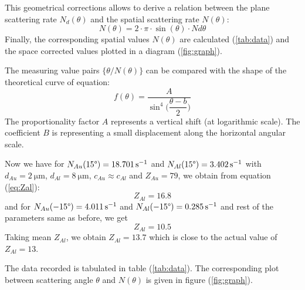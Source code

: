 \documentclass[%
 reprint,
nofootinbib,
 amsmath,amssymb,
 aps,
floatfix,
]{revtex4-2}
\begin{document}
    This geometrical corrections allows to derive a relation between the plane scattering rate $N_d(\theta)$ and the spatial scattering rate $N(\theta)$:
    \begin{equation}
        N (\theta) = 2 \cdot \pi \cdot \sin (\theta) \cdot N d\theta 
    \end{equation}
    Finally, the corresponding spatial values $N(\theta)$ are calculated (\ref{tab:data}) and the space corrected values plotted in a diagram (\ref{fig:graph}).
    \par
    The measuring value pairs $\{\theta / N(\theta )\}$ can be compared with the shape of the theoretical curve of equation:
    \begin{equation}
        f(\theta) = \dfrac{A}{\sin^4 \Big( \dfrac{\theta - b}{2} \Big)}
    \end{equation}
    The proportionality factor $A$ represents a vertical shift (at logarithmic scale). The coefficient $B$ is representing a small displacement along the horizontal angular scale.
    \par
    Now we have for $N_{Au} (15 \degree) = \SI{18.701}{\per \second} $ and $N_{Al} (15 \degree) = \SI{3.402}{\per \second}$ with $d_{Au} = \SI{2}{\micro \metre}$, $d_{Al} = \SI{8}{\micro \metre}$, $c_{Au} \approx c_{Al}$ and $Z_{Au} = 79$, we obtain from equation (\ref{eq:Zal}):
    \begin{equation}
        Z_{Al} = 16.8
    \end{equation}
    and for $N_{Au} (-15 \degree) = \SI{4.011}{\per \second} $ and $N_{Al} (-15 \degree) = \SI{0.285}{\per \second}$ and rest of the parameters same as before, we get
    \begin{equation}
        Z_{Al} = 10.5
    \end{equation}
    Taking mean $Z_{Al}$, we obtain $Z_{Al} = 13.7$ which is close to the actual value of $Z_{Al} = 13$.
    \par
    The data recorded is tabulated in table (\ref{tab:data}). The corresponding plot between scattering angle $\theta$ and $N(\theta)$ is given in figure (\ref{fig:graph}).
    \newcommand{\ra}[1]{\renewcommand{\arraystretch}{#1}}
\end{document}
